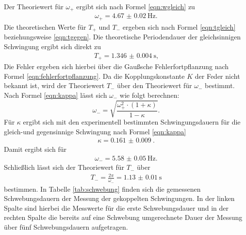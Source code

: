 Der Theoriewert für $\omega_{\mathrm{+}}$ ergibt sich nach Formel \eqref{eqn:wgleich} zu
\begin{align*}
	\omega_{\mathrm{+}}= \SI{4.67(2)}{\Hz} \text{.}
\end{align*}
Die theoretischen Werte für $T_{\mathrm{+}}$ und $T_{\mathrm{-}}$ ergeben sich nach Formel \eqref{eqn:tgleich} beziehungsweise \eqref{eqn:tgegen}.
Die theoretische Periodendauer der gleichsinnigen Schwingung ergibt sich direkt zu
\begin{gather*}
	T_{\mathrm{+}}=\SI{1.346(4)}{\second} \text{,}
\end{gather*}
Die Fehler ergeben sich hierbei über die Gaußsche Fehlerfortpflanzung nach Formel \eqref{eqn:fehlerfortpflanzung}.
Da die Kopplungskonstante $K$ der Feder nicht bekannt ist, wird der Theoriewert $T_{\mathrm{-}}$ über den Theoriewert für $\omega_{\mathrm{-}}$ bestimmt.
Nach Formel \eqref{eqn:kappa} lässt sich $\omega_{\mathrm{-}}$ wie folgt berechnen:
\begin{equation}
	\label{eqn:omegaminus}
	\omega_{\mathrm{-}}=\sqrt{\frac{\omega_{\mathrm{+}}^2 \cdot(1+\kappa)}{1-\kappa}} \text{.}
\end{equation}
Für $\kappa$ ergibt sich mit den experimentell bestimmten Schwingungsdauern für die gleich-und gegensinnige Schwingung nach Formel \eqref{eqn:kappa}
\begin{align*}
	\kappa=\SI{0.161(9)}{} \text{.}
\end{align*}
Damit ergibt sich für
\begin{align*}
	\omega_{\mathrm{-}}=\SI{5.58(5)}{\Hz} \text{.}
\end{align*}
Schließlich lässt sich der Theoriewert für $T_{\mathrm{-}}$ über
\begin{align*}
	T_{\mathrm{-}}=\frac{2\pi}{\omega_{\mathrm{-}}}=\SI{1.13(1)}{\second}
\end{align*}
bestimmen.
In Tabelle \ref{tab:schwebung} finden sich die gemessenen Schwebungsdauern der Messung der gekoppelten Schwingungen.
In der linken Spalte sind hierbei die Messwerte für die erste Schwebungsdauer und in der rechten Spalte die bereits auf eine Schwebung umgerechnete Dauer der Messung über fünf Schwebungsdauern aufgetragen.
